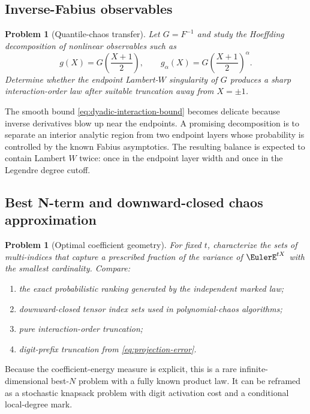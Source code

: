\documentclass[11pt,oneside]{article}
\newtheorem{problem}[theorem]{Problem}
\theoremstyle{definition}
\theoremstyle{remark}
\begin{document}
\subsection{Inverse-Fabius observables}

\begin{problem}[Quantile-chaos transfer]
\label{prob:inverse-chaos}
Let $G=F^{-1}$ and study the Hoeffding decomposition of nonlinear observables
such as
\[
 g(X)=G\left(\frac{X+1}{2}\right),
 \qquad
 g_\alpha(X)=G\left(\frac{X+1}{2}\right)^\alpha.
\]
Determine whether the endpoint Lambert-$W$ singularity of $G$ produces a
sharp interaction-order law after suitable truncation away from $X=\pm1$.
\end{problem}

The smooth bound \eqref{eq:dyadic-interaction-bound} becomes delicate because
inverse derivatives blow up near the endpoints.  A promising decomposition is
to separate an interior analytic region from two endpoint layers whose
probability is controlled by the known Fabius asymptotics.  The resulting
balance is expected to contain Lambert $W$ twice: once in the endpoint layer
width and once in the Legendre degree cutoff.

\subsection{Best N-term and downward-closed chaos approximation}

\begin{problem}[Optimal coefficient geometry]
\label{prob:best-N}
For fixed $t$, characterize the sets of multi-indices that capture a prescribed
fraction of the variance of $\EulerE^{tX}$ with the smallest cardinality.  Compare:
\begin{enumerate}
\item the exact probabilistic ranking generated by the independent marked law;
\item downward-closed tensor index sets used in polynomial-chaos algorithms;
\item pure interaction-order truncation;
\item digit-prefix truncation from \eqref{eq:projection-error}.
\end{enumerate}
\end{problem}

Because the coefficient-energy measure is explicit, this is a rare
infinite-dimensional best-$N$ problem with a fully known product law.  It can
be reframed as a stochastic knapsack problem with digit activation cost and a
conditional local-degree mark.
\end{document}
